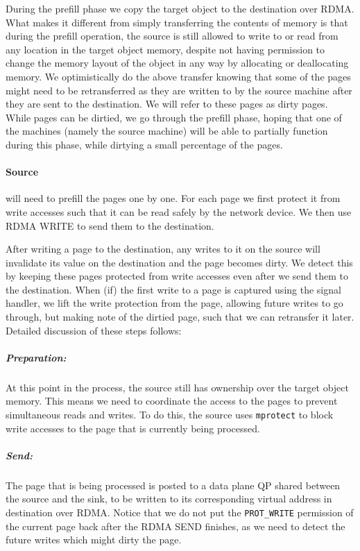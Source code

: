 During the prefill phase we copy the target object to the destination over RDMA.
What makes it different from simply transferring the contents of memory is that
during the prefill operation, the source is still allowed to write to or read from
any location in the target object memory,
despite not having permission to change the memory layout of the object
in any way by allocating or deallocating memory. We optimistically do the above
transfer knowing that some of the pages might need to be retransferred as they
are written to by the source machine after they are sent to the destination.
We will refer to these pages as dirty pages. While pages can be
dirtied, we go through the prefill phase, hoping that one of the
machines (namely the source machine) will be able to partially function during
this phase, while dirtying a small percentage of the pages.

\paragraph{Source} will need to prefill the pages one by one. For each page
we first protect it from write accesses such that it can be read safely
by the network device. We then use RDMA WRITE to send them to the destination.

After writing a page to the destination, any writes to it on the source will
invalidate its value on the destination and the page becomes dirty. We detect
this by keeping these pages protected from write accesses even after we
send them to the destination. When (if) the first write to a page is captured
using the signal handler, we lift the write protection from the page, allowing
future writes to go through, but making note of the dirtied page, such that
we can retransfer it later. Detailed discussion of these steps follows:

\subparagraph{Preparation:} At this point in the process, the source still
has ownership over the target object memory. This means we need to coordinate
the access to the pages to prevent simultaneous reads and writes. To do this,
the source uses \texttt{mprotect} to block write accesses to the page that
is currently being processed.

\subparagraph{Send:} The page that is being processed is posted to a
data plane QP shared between the source and the sink, to be written to
its corresponding virtual address in destination over RDMA.
Notice that we do not put the \texttt{PROT\_WRITE} permission
of the current page back after the RDMA SEND finishes, as we need to
detect the future writes which might dirty the page.

